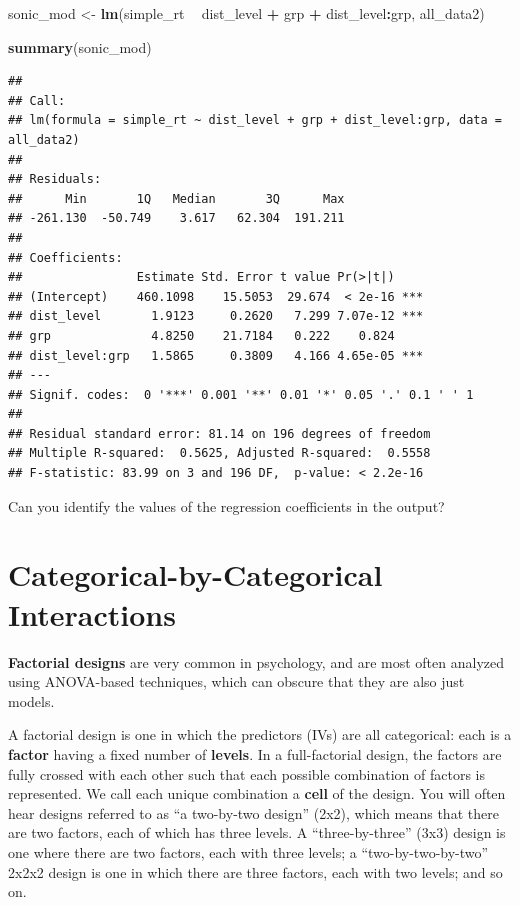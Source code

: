 \documentclass[]{book}
\newenvironment{Shaded}{\begin{snugshade}}{\end{snugshade}}
\newcommand{\KeywordTok}[1]{\textcolor[rgb]{0.13,0.29,0.53}{\textbf{#1}}}
\newcommand{\NormalTok}[1]{#1}
\newcommand{\OperatorTok}[1]{\textcolor[rgb]{0.81,0.36,0.00}{\textbf{#1}}}
\newcommand{\StringTok}[1]{\textcolor[rgb]{0.31,0.60,0.02}{#1}}
\begin{document}
\begin{Shaded}
\begin{Highlighting}[]
\NormalTok{sonic_mod <-}\StringTok{ }\KeywordTok{lm}\NormalTok{(simple_rt }\OperatorTok{~}\StringTok{ }\NormalTok{dist_level }\OperatorTok{+}\StringTok{ }\NormalTok{grp }\OperatorTok{+}\StringTok{ }\NormalTok{dist_level}\OperatorTok{:}\NormalTok{grp, all_data2)}

\KeywordTok{summary}\NormalTok{(sonic_mod)}
\end{Highlighting}
\end{Shaded}

\begin{verbatim}
## 
## Call:
## lm(formula = simple_rt ~ dist_level + grp + dist_level:grp, data = all_data2)
## 
## Residuals:
##      Min       1Q   Median       3Q      Max 
## -261.130  -50.749    3.617   62.304  191.211 
## 
## Coefficients:
##                Estimate Std. Error t value Pr(>|t|)    
## (Intercept)    460.1098    15.5053  29.674  < 2e-16 ***
## dist_level       1.9123     0.2620   7.299 7.07e-12 ***
## grp              4.8250    21.7184   0.222    0.824    
## dist_level:grp   1.5865     0.3809   4.166 4.65e-05 ***
## ---
## Signif. codes:  0 '***' 0.001 '**' 0.01 '*' 0.05 '.' 0.1 ' ' 1
## 
## Residual standard error: 81.14 on 196 degrees of freedom
## Multiple R-squared:  0.5625,	Adjusted R-squared:  0.5558 
## F-statistic: 83.99 on 3 and 196 DF,  p-value: < 2.2e-16
\end{verbatim}

Can you identify the values of the regression coefficients in the output?

\hypertarget{categorical-by-categorical-interactions}{%
\section{Categorical-by-Categorical Interactions}\label{categorical-by-categorical-interactions}}

\textbf{Factorial designs} are very common in psychology, and are most often analyzed using ANOVA-based techniques, which can obscure that they are also just models.

A factorial design is one in which the predictors (IVs) are all categorical: each is a \textbf{factor} having a fixed number of \textbf{levels}. In a full-factorial design, the factors are fully crossed with each other such that each possible combination of factors is represented. We call each unique combination a \textbf{cell} of the design. You will often hear designs referred to as ``a two-by-two design'' (2x2), which means that there are two factors, each of which has three levels. A ``three-by-three'' (3x3) design is one where there are two factors, each with three levels; a ``two-by-two-by-two'' 2x2x2 design is one in which there are three factors, each with two levels; and so on.
\end{document}

